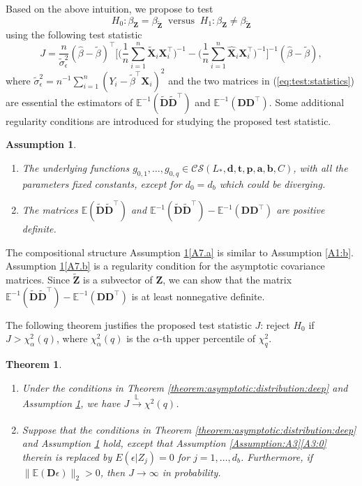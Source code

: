 \documentclass[11pt, preprint]{imsart}
\numberwithin{equation}{section}
\def \mcCS{\mathcal{C}\mathcal{S}}
\def \bfD{\mathbf{D}}
\def \bfX{\mathbf{X}}
\def \bfZ{\mathbf{Z}}
\def \bfd{\mathbf{d}}
\def \bft{\mathbf{t}}
\def \bfp{\mathbf{p}}
\def \bfa{\mathbf{a}}
\def \bfb{\mathbf{b}}
\def \bfD{\mathbf{D}}
\def \bfa{\mathbf{a}}
\def \bfb{\mathbf{b}}
\def \ev{\mathbb{E}}
\def \bft{\mathbf{t}}
\def \cid{\xrightarrow[\text{}]{\text{$\mathbb{L}$}}}
\theoremstyle{plain}
\newtheorem{theorem}{\indent Theorem}
\newtheorem{Assumption}{Assumption}
\theoremstyle{definition}
\begin{document}
Based on the above intuition, we propose to test $$H_0: \beta_{\bfZ}=\beta_{\widetilde{\bfZ}}\;\;\mbox{versus}\;\;H_1: \beta_{\bfZ}\neq \beta_{\widetilde{\bfZ}}$$ using the following test statistic
\begin{equation}\label{eq:test:statistics}
	J=\frac{n}{\widetilde{\sigma}_\epsilon^{2}} (\widehat{\beta}-\widetilde{\beta})^\top\bigg[\bigg(\frac{1}{n}\sum_{i=1}^n\widetilde{\bfX}_i\bfX_i^\top\bigg)^{-1}-\bigg(\frac{1}{n}\sum_{i=1}^n\widehat{\bfX}_i\bfX_i^\top\bigg)^{-1}\bigg]^{-1} (\widehat{\beta}-\widetilde{\beta}),
\end{equation}
where $\widetilde{\sigma}_\epsilon^2=n^{-1}\sum_{i=1}^n(Y_i-\widetilde{\beta}^\top\bfX_i)^2$ and the two matrices in (\ref{eq:test:statistics}) are essential the estimators of $\ev^{-1}(\widetilde{\bfD}\widetilde{\bfD}^\top)$ and $\ev^{-1}({\bfD}{\bfD}^\top)$. 
Some additional regularity conditions are introduced for studying the proposed test statistic.
\begin{Assumption}\label{Assumption:A7}
\begin{enumerate}[label={(\roman*}),ref={(\roman*})]
\item \label{A7.a} The underlying  functions $g_{0,1},\ldots, g_{0,q}\in \mcCS(L_*, \bfd, \bft, \bfp, \bfa, \bfb, C)$, with all the parameters fixed constants, except for $d_0=d_b$ which could be diverging.
\item \label{A7.b} The matrices $\ev(\widetilde{\bfD}\widetilde{\bfD}^\top)$ and $\ev^{-1}(\widetilde{\bfD}\widetilde{\bfD}^\top)-\ev^{-1}({\bfD}{\bfD}^\top)$ are positive definite.
\end{enumerate}
\end{Assumption}

The compositional structure Assumption \ref{Assumption:A7}\ref{A7.a} is similar to Assumption \ref{A1:b}. Assumption \ref{Assumption:A7}\ref{A7.b} is a regularity condition for the asymptotic covariance matrices.  Since $\widetilde{\bfZ}$ is a subvector of $\bfZ$, we can show that the matrix $\ev^{-1}(\widetilde{\bfD}\widetilde{\bfD}^\top)-\ev^{-1}({\bfD}{\bfD}^\top)$ is at least nonnegative definite.

The following theorem justifies the proposed test statistic $J$: reject $H_0$ if $J>\chi^2_\alpha(q)$, where $\chi^2_\alpha(q)$ is the $\alpha$-th upper percentile of $\chi_q^2$. 

\begin{theorem}\label{theorem:specification:test}
\begin{enumerate}
\item Under the conditions in Theorem \ref{theorem:asymptotic:distribution:deep} and Assumption \ref{Assumption:A7}, we have $J\cid \chi^2(q)$.
\item  Suppose that the conditions in Theorem \ref{theorem:asymptotic:distribution:deep} and Assumption \ref{Assumption:A7} hold, except that Assumption \ref{Assumption:A3}\ref{A3:0} therein is replaced by $E(\epsilon|Z_j)=0$ for $j=1,\ldots, d_b$. Furthermore, if $\|\ev(\bfD\epsilon)\|_2>0$, then $J \to \infty$ in probability.
\end{enumerate}
\end{theorem}
\end{document}
